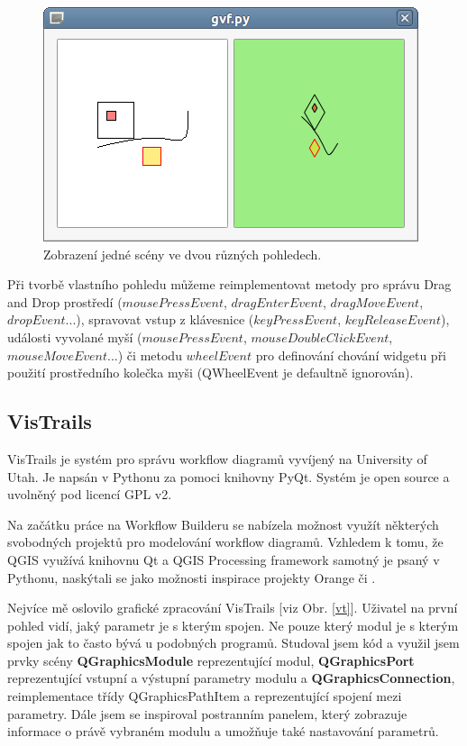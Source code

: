 \begin{figure}[h]
	\centering
	\includegraphics[scale=0.7]{pictures/qt/gsf}
	\caption{Zobrazení jedné scény ve dvou různých pohledech.}
	\label{gsf}
\end{figure}

Při tvorbě vlastního pohledu můžeme reimplementovat metody pro správu Drag and Drop prostředí ($mousePressEvent$, $dragEnterEvent$, $dragMoveEvent$, $dropEvent$...), spravovat vstup z klávesnice ($keyPressEvent$, $keyReleaseEvent$), události vyvolané myší ($mousePressEvent$, $mouseDoubleClickEvent$, $mouseMoveEvent$...) či metodu $wheelEvent$ pro definování chování widgetu při použití prostředního kolečka myši (QWheelEvent je defaultně ignorován).

\subsection{VisTrails}

VisTrails je systém pro správu workflow diagramů vyvíjený na University of Utah. Je napsán v Pythonu za pomoci knihovny PyQt. Systém je open source a uvolněný pod licencí GPL v2. 

Na začátku práce na Workflow Builderu se nabízela možnost využít některých svobodných projektů pro modelování workflow diagramů. Vzhledem k tomu, že QGIS využívá knihovnu Qt a QGIS Processing framework samotný je psaný  v Pythonu, naskýtali se jako možnosti inspirace projekty Orange či .

Nejvíce mě oslovilo grafické zpracování VisTrails [viz Obr. \ref{vt}]. Uživatel na první pohled vidí, jaký parametr je s kterým spojen. Ne pouze který modul je s kterým spojen jak to často bývá u podobných programů. Studoval jsem kód a využil jsem prvky scény \textbf{QGraphicsModule} reprezentující modul, \textbf{QGraphicsPort} reprezentující vstupní a výstupní parametry modulu a \textbf{QGraphicsConnection}, reimplementace třídy QGraphicsPathItem a  reprezentující spojení mezi parametry. Dále jsem se inspiroval postranním panelem, který zobrazuje informace o právě vybraném modulu a umožňuje také nastavování parametrů.

